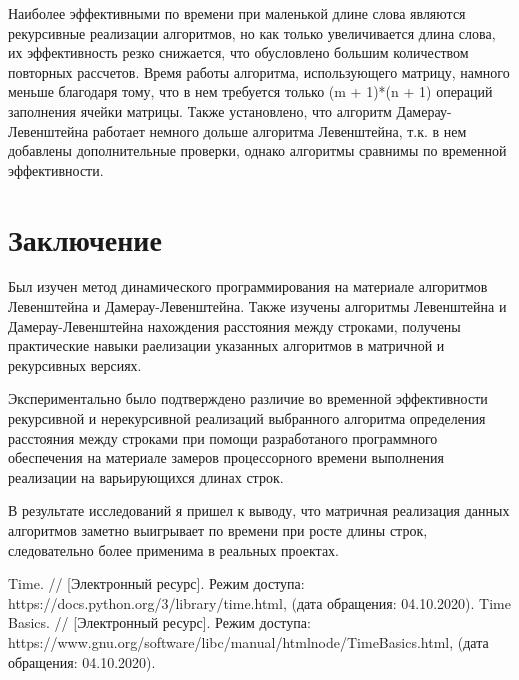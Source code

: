 \documentclass[utf8x, 12pt]{G7-32}
\begin{document}
\par
Наиболее эффективными по времени при маленькой длине слова являются рекурсивные реализации алгоритмов, но как только увеличивается длина слова, их эффективность резко снижается, что обусловлено большим количеством повторных рассчетов. Время работы алгоритма, использующего матрицу, намного меньше благодаря тому, что в нем требуется только (m + 1)*(n + 1) операций заполнения ячейки матрицы. Также установлено, что алгоритм Дамерау-Левенштейна работает немного дольше алгоритма Левенштейна, т.к. в нем добавлены дополнительные проверки, однако алгоритмы сравнимы по временной эффективности.


\chapter*{Заключение}
Был изучен метод динамического программирования на материале алгоритмов Левенштейна и Дамерау-Левенштейна.
Также изучены алгоритмы Левенштейна и Дамерау-Левенштейна нахождения расстояния между строками, получены практические навыки раелизации указанных алгоритмов в матричной  и рекурсивных версиях. 

Экспериментально было подтверждено различие во временной эффективности рекурсивной и нерекурсивной реализаций выбранного алгоритма определения расстояния между строками при помощи разработаного программного обеспечения на материале замеров процессорного времени выполнения реализации на варьирующихся длинах строк. 

В результате исследований я пришел к выводу, что матричная реализация данных алгоритмов заметно выигрывает по времени при росте длины строк, следовательно более применима в реальных проектах.
 
\begin{thebibliography}{}
      Time. // [Электронный ресурс]. Режим доступа: https://docs.python.org/3/library/time.html, (дата обращения: 04.10.2020).
      Time Basics. // [Электронный ресурс]. Режим доступа: https://www.gnu.org/software/libc/manual/html\-node/Time\-Basics.html, (дата обращения: 04.10.2020).
\end{thebibliography}
\end{document}
